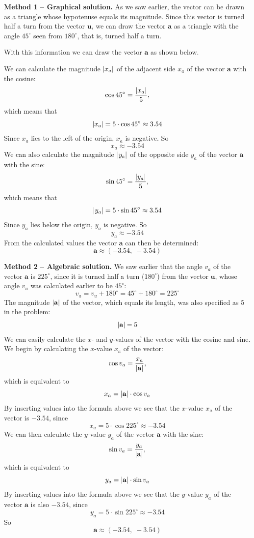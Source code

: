 \begin{exempel}
\textbf{Method 1 -- Graphical solution.} As we saw earlier, the vector can be drawn as a
triangle whose hypotenuse equals its magnitude. Since this vector is turned half a turn from
the vector $\mathbf{u}$, we can draw the vector $\mathbf{a}$ as a triangle with the angle
$45^{\circ}$ seen from $180^{\circ}$, that is, turned half a turn.

With this information we can draw the vector $\mathbf{a}$ as shown below.


We can calculate the magnitude $\lvert x_a\rvert$ of the adjacent side $x_a$ of the vector
$\mathbf{a}$ with the cosine:
\[
  \cos 45^{\circ} = \frac{\lvert x_a\rvert}{5},
\]
which means that
\[
  \lvert x_a\rvert = 5 \cdot \cos 45^{\circ} \approx 3.54
\]
Since $x_a$ lies to the left of the origin, $x_a$ is negative. So
\[
  x_a \approx -3.54
\]
We can also calculate the magnitude $\lvert y_a\rvert$ of the opposite side $y_a$ of the vector
$\mathbf{a}$ with the sine:
\[
  \sin 45^{\circ} = \frac{\lvert y_a\rvert}{5},
\]
which means that
\[
  \lvert y_a\rvert = 5 \cdot \sin 45^{\circ} \approx 3.54
\]
Since $y_a$ lies below the origin, $y_a$ is negative. So
\[
  y_a \approx -3.54
\]
From the calculated values the vector $\mathbf{a}$ can then be determined:
\[
  \mathbf{a} \approx (-3.54,\; -3.54)
\]

\textbf{Method 2 -- Algebraic solution.} We saw earlier that the angle $v_a$ of the vector
$\mathbf{a}$ is $225^{\circ}$, since it is turned half a turn ($180^{\circ}$) from the vector
$\mathbf{u}$, whose angle $v_u$ was calculated earlier to be $45^{\circ}$:
\[
  v_a = v_u + 180^{\circ} = 45^{\circ} + 180^{\circ} = 225^{\circ}
\]
The magnitude $\lvert\mathbf{a}\rvert$ of the vector, which equals its length, was also specified as
$5$ in the problem:
\[
  \lvert\mathbf{a}\rvert = 5
\]
We can easily calculate the $x$- and $y$-values of the vector with the cosine and sine. We
begin by calculating the $x$-value $x_a$ of the vector:
\[
  \cos v_a = \frac{x_a}{\lvert\mathbf{a}\rvert},
\]
which is equivalent to
\[
  x_a = \lvert\mathbf{a}\rvert \cdot \cos v_a
\]
By inserting values into the formula above we see that the $x$-value $x_a$ of the vector is
$-3.54$, since
\[
  x_a = 5 \cdot \cos 225^{\circ} \approx -3.54
\]
We can then calculate the $y$-value $y_a$ of the vector $\mathbf{a}$ with the sine:
\[
  \sin v_a = \frac{y_a}{\lvert\mathbf{a}\rvert},
\]
which is equivalent to
\[
  y_a = \lvert\mathbf{a}\rvert \cdot \sin v_a
\]
By inserting values into the formula above we see that the $y$-value $y_a$ of the vector
$\mathbf{a}$ is also $-3.54$, since
\[
  y_a = 5 \cdot \sin 225^{\circ} \approx -3.54
\]
So
\[
  \mathbf{a} \approx (-3.54,\; -3.54)
\]
\end{exempel}
